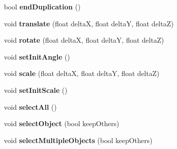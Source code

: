 \begin{DoxyCompactItemize}
\item 
\hypertarget{class_interface_graphique_1_1_engine_a8c1b430ab3eac66594cb5ebb8e4efd4a}{bool {\bfseries end\-Duplication} ()}\label{class_interface_graphique_1_1_engine_a8c1b430ab3eac66594cb5ebb8e4efd4a}

\item 
\hypertarget{class_interface_graphique_1_1_engine_a7383d6a2834b761bf0e311fdbf460d24}{void {\bfseries translate} (float delta\-X, float delta\-Y, float delta\-Z)}\label{class_interface_graphique_1_1_engine_a7383d6a2834b761bf0e311fdbf460d24}

\item 
\hypertarget{class_interface_graphique_1_1_engine_a13f9dce829254dbc31fe01aadd1ba8c6}{void {\bfseries rotate} (float delta\-X, float delta\-Y, float delta\-Z)}\label{class_interface_graphique_1_1_engine_a13f9dce829254dbc31fe01aadd1ba8c6}

\item 
\hypertarget{class_interface_graphique_1_1_engine_aed36e2c31333883918d7103305b96236}{void {\bfseries set\-Init\-Angle} ()}\label{class_interface_graphique_1_1_engine_aed36e2c31333883918d7103305b96236}

\item 
\hypertarget{class_interface_graphique_1_1_engine_a0129ba7f711fbf300f354611a8febfd1}{void {\bfseries scale} (float delta\-X, float delta\-Y, float delta\-Z)}\label{class_interface_graphique_1_1_engine_a0129ba7f711fbf300f354611a8febfd1}

\item 
\hypertarget{class_interface_graphique_1_1_engine_a2dab2445d57cc6cfd90f75e613360614}{void {\bfseries set\-Init\-Scale} ()}\label{class_interface_graphique_1_1_engine_a2dab2445d57cc6cfd90f75e613360614}

\item 
\hypertarget{class_interface_graphique_1_1_engine_a2e7f0b1331fd2ee58915a022ec3d579d}{void {\bfseries select\-All} ()}\label{class_interface_graphique_1_1_engine_a2e7f0b1331fd2ee58915a022ec3d579d}

\item 
\hypertarget{class_interface_graphique_1_1_engine_a18cc8cefa5e5a0544d71b80e3c5d8335}{void {\bfseries select\-Object} (bool keep\-Others)}\label{class_interface_graphique_1_1_engine_a18cc8cefa5e5a0544d71b80e3c5d8335}

\item 
\hypertarget{class_interface_graphique_1_1_engine_a8bd0f5e2f7e3549600ba8b5197c344cc}{void {\bfseries select\-Multiple\-Objects} (bool keep\-Others)}\label{class_interface_graphique_1_1_engine_a8bd0f5e2f7e3549600ba8b5197c344cc}


\end{DoxyCompactItemize}
